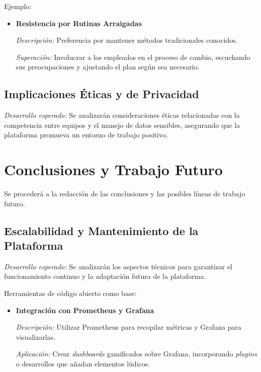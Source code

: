 \documentclass[journal]{IEEEtran}
\begin{document}
Ejemplo:

\begin{itemize}
    \item \textbf{Resistencia por Rutinas Arraigadas}
    
    \textit{Descripción:} Preferencia por mantener métodos tradicionales conocidos.
    
    \textit{Superación:} Involucrar a los empleados en el proceso de cambio, escuchando sus preocupaciones y ajustando el plan según sea necesario.
\end{itemize}

\subsection{\textbf{Implicaciones Éticas y de Privacidad}}

\textit{Desarrollo esperado:} Se analizarán consideraciones éticas relacionadas con la competencia entre equipos y el manejo de datos sensibles, asegurando que la plataforma promueva un entorno de trabajo positivo.

\section{\textbf{\Large Conclusiones y Trabajo Futuro}}
Se procederá a la redacción de las conclusiones y las posibles líneas de trabajo futuro.

\subsection{\textbf{Escalabilidad y Mantenimiento de la Plataforma}}

\textit{Desarrollo esperado:} Se analizarán los aspectos técnicos para garantizar el funcionamiento continuo y la adaptación futura de la plataforma.

Herramientas de código abierto como base:

\begin{itemize}
    \item \textbf{Integración con Prometheus y Grafana}
    
    \textit{Descripción:} Utilizar Prometheus para recopilar métricas y Grafana para visualizarlas.
    
    \textit{Aplicación:} Crear \textit{dashboards} gamificados sobre Grafana, incorporando \textit{plugins} o desarrollos que añadan elementos lúdicos.
\end{itemize}




\end{document}
